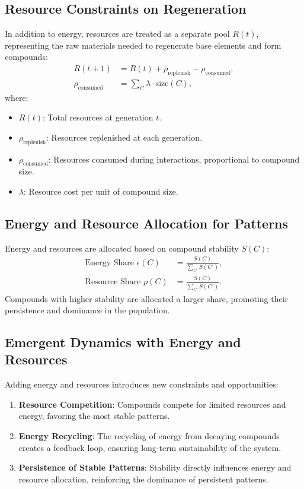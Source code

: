 \documentclass[entropy,article,submit,pdftex,moreauthors]{Definitions/mdpi}
\begin{document}
\subsection{Resource Constraints on Regeneration}

In addition to energy, resources are treated as a separate pool \( R(t) \), representing the raw materials needed to regenerate base elements and form compounds:
\begin{align}
R(t+1) &= R(t) + \rho_{\text{replenish}} - \rho_{\text{consumed}}, \\
\rho_{\text{consumed}} &= \sum_{C} \lambda \cdot \text{size}(C),
\end{align}
where:
\begin{itemize}
    \item \( R(t) \): Total resources at generation \( t \).
    \item \( \rho_{\text{replenish}} \): Resources replenished at each generation.
    \item \( \rho_{\text{consumed}} \): Resources consumed during interactions, proportional to compound size.
    \item \( \lambda \): Resource cost per unit of compound size.
\end{itemize}

\subsection{Energy and Resource Allocation for Patterns}

Energy and resources are allocated based on compound stability \( S(C) \):
\begin{align}
\text{Energy Share } \epsilon(C) &= \frac{S(C)}{\sum_{C'} S(C')}, \\
\text{Resource Share } \rho(C) &= \frac{S(C)}{\sum_{C'} S(C')}.
\end{align}
Compounds with higher stability are allocated a larger share, promoting their persistence and dominance in the population.

\subsection{Emergent Dynamics with Energy and Resources}

Adding energy and resources introduces new constraints and opportunities:
\begin{enumerate}
    \item \textbf{Resource Competition}: Compounds compete for limited resources and energy, favoring the most stable patterns.
    \item \textbf{Energy Recycling}: The recycling of energy from decaying compounds creates a feedback loop, ensuring long-term sustainability of the system.
    \item \textbf{Persistence of Stable Patterns}: Stability directly influences energy and resource allocation, reinforcing the dominance of persistent patterns.
\end{enumerate}
\end{document}
